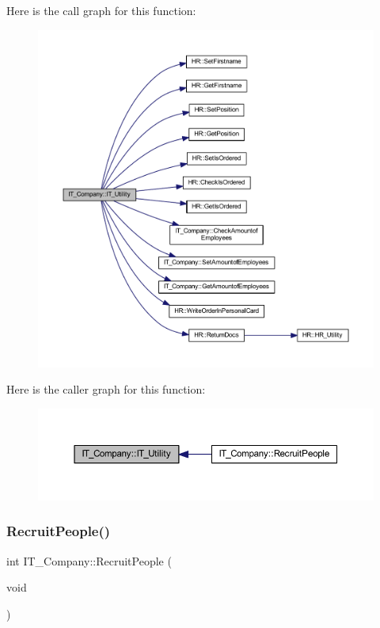 Here is the call graph for this function\+:
\nopagebreak
\begin{figure}[H]
\begin{center}
\leavevmode
\includegraphics[width=350pt]{class_i_t___company_a06d2d0d74d96533e474618fb92291c04_cgraph}
\end{center}
\end{figure}
Here is the caller graph for this function\+:
\nopagebreak
\begin{figure}[H]
\begin{center}
\leavevmode
\includegraphics[width=350pt]{class_i_t___company_a06d2d0d74d96533e474618fb92291c04_icgraph}
\end{center}
\end{figure}
\mbox{\label{class_i_t___company_a2753c0f3da2fb8aee6a48b3ebe3bef79}} 
\subsubsection{\texorpdfstring{Recruit\+People()}{RecruitPeople()}}
{\footnotesize\ttfamily int I\+T\+\_\+\+Company\+::\+Recruit\+People (\begin{DoxyParamCaption}\item[{void}]{ }\end{DoxyParamCaption})}



